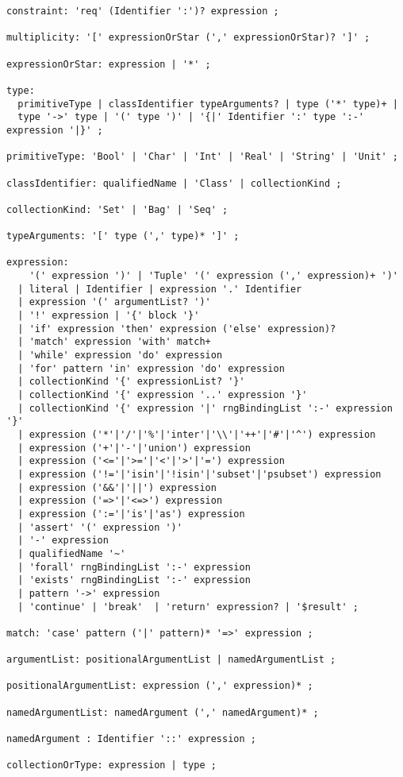 {\begin{verbatim}
constraint: 'req' (Identifier ':')? expression ;

multiplicity: '[' expressionOrStar (',' expressionOrStar)? ']' ;

expressionOrStar: expression | '*' ;

type:
  primitiveType | classIdentifier typeArguments? | type ('*' type)+ | 
  type '->' type | '(' type ')' | '{|' Identifier ':' type ':-' expression '|}' ;

primitiveType: 'Bool' | 'Char' | 'Int' | 'Real' | 'String' | 'Unit' ;

classIdentifier: qualifiedName | 'Class' | collectionKind ;

collectionKind: 'Set' | 'Bag' | 'Seq' ;

typeArguments: '[' type (',' type)* ']' ;

expression: 
    '(' expression ')' | 'Tuple' '(' expression (',' expression)+ ')' 
  | literal | Identifier | expression '.' Identifier 
  | expression '(' argumentList? ')' 
  | '!' expression | '{' block '}' 
  | 'if' expression 'then' expression ('else' expression)? 
  | 'match' expression 'with' match+  
  | 'while' expression 'do' expression  
  | 'for' pattern 'in' expression 'do' expression 
  | collectionKind '{' expressionList? '}' 
  | collectionKind '{' expression '..' expression '}' 
  | collectionKind '{' expression '|' rngBindingList ':-' expression '}' 
  | expression ('*'|'/'|'%'|'inter'|'\\'|'++'|'#'|'^') expression
  | expression ('+'|'-'|'union') expression 
  | expression ('<='|'>='|'<'|'>'|'=') expression
  | expression ('!='|'isin'|'!isin'|'subset'|'psubset') expression 
  | expression ('&&'|'||') expression 
  | expression ('=>'|'<=>') expression 
  | expression (':='|'is'|'as') expression 
  | 'assert' '(' expression ')' 
  | '-' expression 
  | qualifiedName '~' 
  | 'forall' rngBindingList ':-' expression 
  | 'exists' rngBindingList ':-' expression 
  | pattern '->' expression 
  | 'continue' | 'break'  | 'return' expression? | '$result' ;

match: 'case' pattern ('|' pattern)* '=>' expression ;

argumentList: positionalArgumentList | namedArgumentList ;

positionalArgumentList: expression (',' expression)* ;

namedArgumentList: namedArgument (',' namedArgument)* ;

namedArgument : Identifier '::' expression ;

collectionOrType: expression | type ;


\end{verbatim}}
